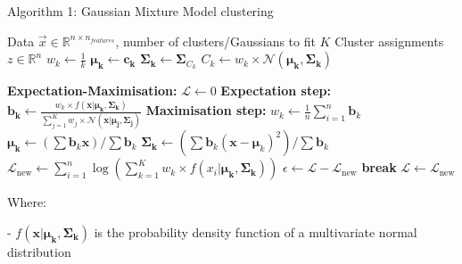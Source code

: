 \documentclass[12pt]{report} %
\begin{document}
\begin{definitionbox}{Algorithm 1: Gaussian Mixture Model clustering}
  \begin{algorithmic}[1]
    \State Data $\vec{x} \in \mathbb{R}^{n \times n_{features}}$, number of clusters/Gaussians to fit $K$ 
    \State Cluster assignments $z \in \mathbb{R}^n$ 
    \State $w_{k} \gets \frac{1}{k}$ 
    \State $\mathbf{\mu_{k}} \gets \mathbf{c_{k}}$ 
    \State $\mathbf{\Sigma_{k}} \gets \mathbf{\Sigma}_{C_{k}}$ 
    \State $C_{k} \gets w_{k} \times \mathcal{N}(\mathbf{\mu_{k}}, \mathbf{\Sigma_{k}})$ 

    \State \textbf{Expectation-Maximisation:}
    \State $\mathcal{L} \gets 0$ 
      \State \textbf{Expectation step:}
        \State $\mathbf{b_{k}} \gets \frac{w_{k} \times f(\mathbf{x}|\mathbf{\mu_{k}}, \mathbf{\Sigma_{k}})}{\sum_{j=1}^{K} w_{j} \times \mathcal{N}(\mathbf{x}|\mathbf{\mu_{j}}, \mathbf{\Sigma_{j}})}$ 
      \EndFor
      \State \textbf{Maximisation step:}
        \State $w_{k} \gets \frac{1}{n} \sum_{i=1}^{n} \mathbf{b}_{k}$ 
        \State $\mathbf{\mu_{k}} \gets (\sum \mathbf{b}_{k}\mathbf{x})/\sum \mathbf{b}_{k}$ 
        \State $\mathbf{\Sigma_{k}} \gets (\sum \mathbf{b}_{k}(\mathbf{x} - \mathbf{\mu}_{k})^{2})/\sum \mathbf{b}_{k}$ 
      \EndFor
      \State $\mathcal{L}_{\text{new}} \gets \sum_{i=1}^{n} \log(\sum_{k=1}^{K} w_{k} \times f(x_{i}|\mathbf{\mu_{k}}, \mathbf{\Sigma_{k}}))$ 
      \State $\epsilon \gets \mathcal{L} - \mathcal{L}_{\text{new}}$ 
        \State \textbf{break}
      \EndIf
      \State $\mathcal{L} \gets \mathcal{L}_{\text{new}}$ 
    \EndFor


  \end{algorithmic}
  Where:

  - $f(\mathbf{x}|\mathbf{\mu_{k}}, \mathbf{\Sigma_{k}})$ is the probability density function of a multivariate normal distribution
\end{definitionbox}





\end{document}
